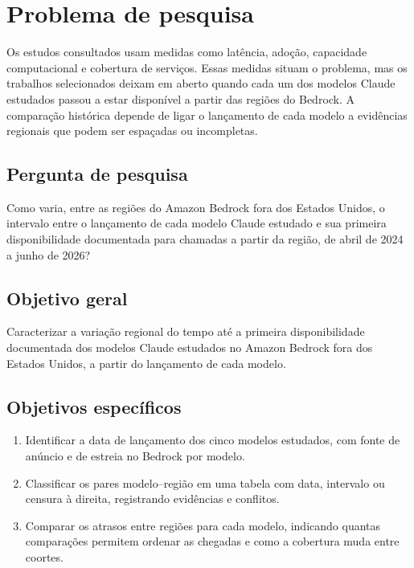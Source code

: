 \documentclass[12pt,a4paper]{article}
\begin{document}
\section{Problema de pesquisa}

Os estudos consultados usam medidas como latência, adoção, capacidade computacional e cobertura de serviços. Essas medidas situam o problema, mas os trabalhos selecionados deixam em aberto quando cada um dos modelos Claude estudados passou a estar disponível a partir das regiões do Bedrock. A comparação histórica depende de ligar o lançamento de cada modelo a evidências regionais que podem ser espaçadas ou incompletas.

\subsection{Pergunta de pesquisa}

Como varia, entre as regiões do Amazon Bedrock fora dos Estados Unidos, o intervalo entre o lançamento de cada modelo Claude estudado e sua primeira disponibilidade documentada para chamadas a partir da região, de abril de 2024 a junho de 2026?

\clearpage
\subsection{Objetivo geral}

Caracterizar a variação regional do tempo até a primeira disponibilidade documentada dos modelos Claude estudados no Amazon Bedrock fora dos Estados Unidos, a partir do lançamento de cada modelo.

\subsection{Objetivos específicos}

\begin{enumerate}
  \setlength{\itemsep}{0pt}
  \setlength{\parsep}{0pt}
  \item Identificar a data de lançamento dos cinco modelos estudados, com fonte de anúncio e de estreia no Bedrock por modelo.
  \item Classificar os pares modelo--região em uma tabela com data, intervalo ou censura à direita, registrando evidências e conflitos.
  \item Comparar os atrasos entre regiões para cada modelo, indicando quantas comparações permitem ordenar as chegadas e como a cobertura muda entre coortes.
\end{enumerate}
\end{document}
